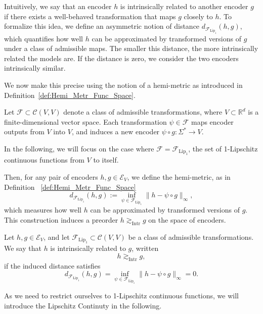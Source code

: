 Intuitively, we say that an encoder \( h \) is intrinsically related to another encoder \( g \) if there exists a well-behaved transformation that maps \( g \) closely to \( h \). 
To formalize this idea, we define an asymmetric notion of distance \( d_{\mathcal{F}_{\text{Lip}_1}}(h, g) \), which quantifies how well \( h \) can be approximated by transformed versions of \( g \) under a class of admissible maps. The smaller this distance, the more intrinsically related the models are. If the distance is zero, we consider the two encoders intrinsically similar.

We now make this precise using the notion of a hemi-metric as introduced in Definition~\ref{def:Hemi_Metr_Func_Space}. 

Let \( \mathcal{F} \subset \mathcal{C}(V, V) \) denote a class of admissible transformations, where \( V \subset \mathbb{R}^d \) is a finite-dimensional vector space.  
Each transformation \( \psi \in \mathcal{F} \) maps encoder outputs from \( V \) into \( V \), and induces a new encoder \( \psi \circ g \colon \Sigma^* \to V \).

In the following, we will focus on the case where \( \mathcal{F} = \mathcal{F}_{\mathrm{Lip}_1} \), the set of 1-Lipschitz continuous functions from \( V \) to itself.


Then, for any pair of encoders \( h,  g \in \mathcal{E}_V \), we define the hemi-metric, as in Definition ~\ref{def:Hemi_Metr_Func_Space} %
\[
d_{ \mathcal{F}_{\mathrm{Lip}_1}}(h, g) := \inf_{\psi \in \mathcal{F}_{\mathrm{Lip}_1}} \| h - \psi \circ g \|_\infty,
\]
which measures how well \( h \) can be approximated by transformed versions of \( g \). 
This construction induces a preorder \( h \gtrsim_{\mathrm{Intr}} g \) on the space of encoders.
 
\begin{definition}\label{eq:intrinsic_equation}
Let \( h, g \in \mathcal{E}_V \), and let \(  \mathcal{F}_{\mathrm{Lip}_1} \subset \mathcal{C}(V, V) \) be a class of admissible transformations.
We say that \( h \) is intrinsically related to \( g \), written
\[
h \gtrsim_{\mathrm{Intr}} g,
\]
if the induced distance satisfies
\[
d_{\mathcal{F}_{\text{Lip}_1}}(h, g) = \inf_{\psi \in \mathcal{F}_{\mathrm{Lip}_1}} \| h - \psi \circ g \|_\infty = 0.
\]
\end{definition}

As we need to restrict ourselves to 1-Lipschitz continuous functions, we will introduce the Lipschitz Continuty in the following.   

